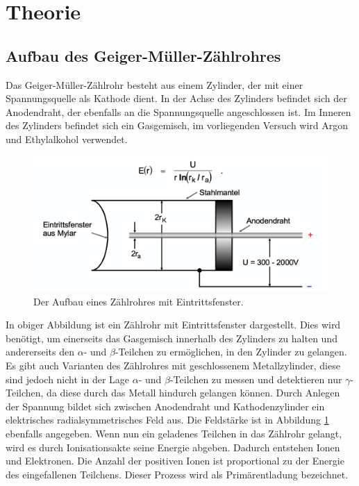 \section{Theorie}
  \subsection{Aufbau des Geiger-Müller-Zählrohres}
    Das Geiger-Müller-Zählrohr besteht aus einem Zylinder, der mit einer Spannungsquelle als
    Kathode dient. In der Achse des Zylinders befindet sich der Anodendraht, der ebenfalls an die
    Spannungsquelle angeschlossen ist. Im Inneren des Zylinders befindet sich ein Gasgemisch,
    im vorliegenden Versuch wird Argon und Ethylalkohol verwendet.
    \begin{figure}[H]
      \centering
        \includegraphics[scale=0.4]{content/AufbauGMZ.png}
        \caption{Der Aufbau eines Zählrohres mit Eintrittsfenster.}
        \label{fig:aufbau1}
    \end{figure}
    \noindent
    In obiger Abbildung ist ein Zählrohr mit Eintrittsfenster dargestellt. Dies wird benötigt,
    um einerseits das Gasgemisch innerhalb des Zylinders zu halten und andererseits den
    $\alpha$- und $\beta$-Teilchen zu ermöglichen, in den Zylinder zu gelangen. Es gibt auch
    Varianten des Zählrohres mit geschlossenem Metallzylinder, diese sind jedoch nicht in der Lage
    $\alpha$- und $\beta$-Teilchen zu messen und detektieren nur $\gamma$-Teilchen, da diese durch das
    Metall hindurch gelangen können.
    Durch Anlegen der Spannung bildet sich zwischen Anodendraht und Kathodenzylinder ein elektrisches
    radialsymmetrisches Feld aus. Die Feldstärke ist in Abbildung \ref{fig:aufbau1} ebenfalls
    angegeben. Wenn nun ein geladenes Teilchen in das Zählrohr gelangt, wird es durch Ionisationsakte
    seine Energie abgeben. Dadurch entstehen Ionen und Elektronen. Die Anzahl der positiven Ionen ist
    proportional zu der Energie des eingefallenen Teilchens. Dieser Prozess wird als Primärentladung
    bezeichnet.
